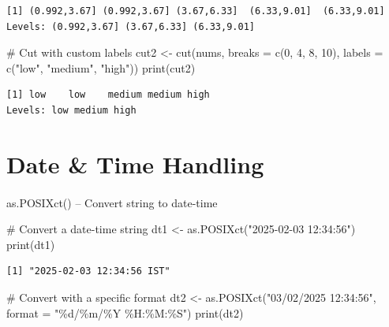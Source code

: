 \documentclass[
  letterpaper,
  DIV=11,
  numbers=noendperiod]{scrartcl}
\makeatletter
\let\oldparagraph\paragraph
\renewcommand{\paragraph}{
    \@ifstar
      \xxxParagraphStar
      \xxxParagraphNoStar
  }
\newcommand{\xxxParagraphStar}[1]{\oldparagraph*{#1}\mbox{}}
\newcommand{\xxxParagraphNoStar}[1]{\oldparagraph{#1}\mbox{}}
\newenvironment{Shaded}{\begin{snugshade}}{\end{snugshade}}
\newcommand{\AttributeTok}[1]{\textcolor[rgb]{0.40,0.45,0.13}{#1}}
\newcommand{\CommentTok}[1]{\textcolor[rgb]{0.37,0.37,0.37}{#1}}
\newcommand{\DecValTok}[1]{\textcolor[rgb]{0.68,0.00,0.00}{#1}}
\newcommand{\FunctionTok}[1]{\textcolor[rgb]{0.28,0.35,0.67}{#1}}
\newcommand{\NormalTok}[1]{\textcolor[rgb]{0.00,0.23,0.31}{#1}}
\newcommand{\OtherTok}[1]{\textcolor[rgb]{0.00,0.23,0.31}{#1}}
\newcommand{\StringTok}[1]{\textcolor[rgb]{0.13,0.47,0.30}{#1}}
\makeatother
\begin{document}
\begin{verbatim}
[1] (0.992,3.67] (0.992,3.67] (3.67,6.33]  (6.33,9.01]  (6.33,9.01] 
Levels: (0.992,3.67] (3.67,6.33] (6.33,9.01]
\end{verbatim}

\begin{Shaded}
\begin{Highlighting}[]
\CommentTok{\#   Cut with custom labels}
\NormalTok{cut2 }\OtherTok{\textless{}{-}} \FunctionTok{cut}\NormalTok{(nums, }\AttributeTok{breaks =} \FunctionTok{c}\NormalTok{(}\DecValTok{0}\NormalTok{, }\DecValTok{4}\NormalTok{, }\DecValTok{8}\NormalTok{, }\DecValTok{10}\NormalTok{), }\AttributeTok{labels =} \FunctionTok{c}\NormalTok{(}\StringTok{"low"}\NormalTok{, }\StringTok{"medium"}\NormalTok{, }\StringTok{"high"}\NormalTok{))}
\FunctionTok{print}\NormalTok{(cut2)}
\end{Highlighting}
\end{Shaded}

\begin{verbatim}
[1] low    low    medium medium high  
Levels: low medium high
\end{verbatim}

\section{Date \& Time Handling}\label{7-date--time-handling}

\paragraph{as.POSIXct() -- Convert string to
date-time}\label{as.posixct-convert-string-to-date-time}

\begin{Shaded}
\begin{Highlighting}[]
\CommentTok{\#   Convert a date{-}time string}
\NormalTok{dt1 }\OtherTok{\textless{}{-}} \FunctionTok{as.POSIXct}\NormalTok{(}\StringTok{"2025{-}02{-}03 12:34:56"}\NormalTok{)}
\FunctionTok{print}\NormalTok{(dt1)}
\end{Highlighting}
\end{Shaded}

\begin{verbatim}
[1] "2025-02-03 12:34:56 IST"
\end{verbatim}

\begin{Shaded}
\begin{Highlighting}[]
\CommentTok{\#   Convert with a specific format}
\NormalTok{dt2 }\OtherTok{\textless{}{-}} \FunctionTok{as.POSIXct}\NormalTok{(}\StringTok{"03/02/2025 12:34:56"}\NormalTok{, }\AttributeTok{format =} \StringTok{"\%d/\%m/\%Y \%H:\%M:\%S"}\NormalTok{)}
\FunctionTok{print}\NormalTok{(dt2)}
\end{Highlighting}
\end{Shaded}
\end{document}
